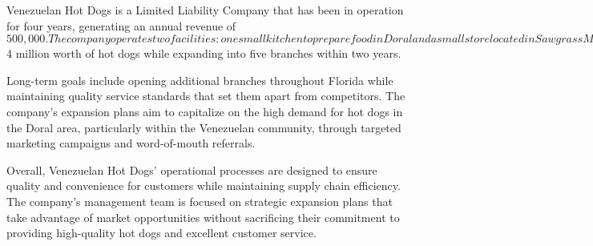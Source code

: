 Venezuelan Hot Dogs is a Limited Liability Company that has been in operation for four years, generating an annual revenue of $500,000. The company operates two facilities: one small kitchen to prepare food in Doral and a small store located in Sawgrass Mall. Venezuelan Hot Dogs sources its sausages from three suppliers and bread from one supplier to serve high-quality hot dogs quickly and efficiently. All other ingredients are purchased from Costco, and the company analyzes weekly sales to manage inventory levels effectively.

Venezuelan Hot Dogs maintains a small area for frozen food storage at its facility, and the purchasing department orders supplies every week based on sales data analysis from the previous week. Currently employing ten people at both locations combined (full-time employees), Venezuelan Hot Dogs plans to hire friends and family members living within the Venezuelan community as part-time employees for future expansion.

The company follows basic HR policies such as hourly employee wages as per law requirements. Venezuelan Hot Dogs will provide training programs for all personnel based on their standards to ensure quality control across all locations.

In the future, Venezuelan Hot Dogs plans to open six more stores in the Doral area within a year and expand to Miami with six new stores per year. With these operational processes in place, Venezuelan Hot Dogs aims to meet its short-term goal of selling $4 million worth of hot dogs while expanding into five branches within two years.

Long-term goals include opening additional branches throughout Florida while maintaining quality service standards that set them apart from competitors. The company's expansion plans aim to capitalize on the high demand for hot dogs in the Doral area, particularly within the Venezuelan community, through targeted marketing campaigns and word-of-mouth referrals.

Overall, Venezuelan Hot Dogs' operational processes are designed to ensure quality and convenience for customers while maintaining supply chain efficiency. The company's management team is focused on strategic expansion plans that take advantage of market opportunities without sacrificing their commitment to providing high-quality hot dogs and excellent customer service.